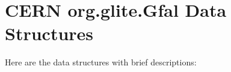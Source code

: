 \section{CERN org.glite.Gfal Data Structures}
Here are the data structures with brief descriptions:\begin{CompactList}
\item{}
\item{}
\item{}
\end{CompactList}

